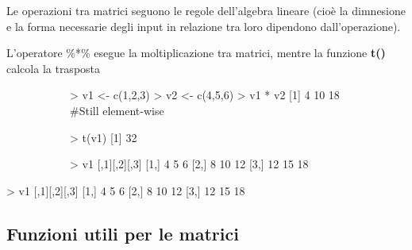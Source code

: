 
Le operazioni tra matrici seguono le regole dell'algebra lineare (cioè la dimnesione e la forma necessarie degli input in relazione tra loro dipendono dall'operazione). \par
L'operatore \%*\% esegue la moltiplicazione tra matrici, mentre la funzione \textbf{t()} calcola la trasposta




\begin{figure}[H]
    \centering %
    \begin{subfigure}[b]{0.3\textwidth} 
        \centering
        \begin{codiceR}
> v1 <- c(1,2,3)
> v2 <- c(4,5,6)
> v1 * v2
[1] 4 10 18
#Still element-wise
        \end{codiceR} 
    \end{subfigure}
    \hfill
    \begin{subfigure}[b]{0.3\textwidth} 
        \centering
        \begin{codiceR}
> t(v1) %
[1] 32
        \end{codiceR}
    \end{subfigure}
    \hfill
    \begin{subfigure}[b]{0.3\textwidth}
        \centering
\begin{codiceR}
> v1 %
      [,1][,2][,3]
[1,]    4   5   6
[2,]    8   10  12
[3,]    12  15  18
\end{codiceR}

    \end{subfigure}

\end{figure}



\begin{codiceR}
> v1 %
      [,1][,2][,3]
[1,]    4   5   6
[2,]    8   10  12
[3,]    12  15  18
\end{codiceR}



\subsection{Funzioni utili per le matrici}

